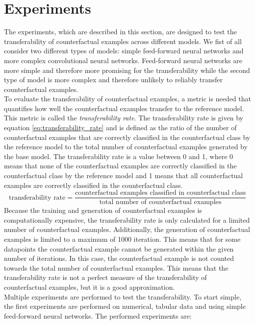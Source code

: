 \documentclass{article}
\begin{document}
\section{Experiments}
The experiments, which are described in this section, are designed to test the transferability of counterfactual examples across different models. We fist of all consider two different types of models: simple feed-forward neural networks and more complex convolutional neural networks. Feed-forward neural networks are more simple and therefore more promising for the transferability while the second type of model is more complex and therefore unlikely to reliably transfer counterfactual examples.\\
To evaluate the transferability of counterfactual examples, a metric is needed that quantifies how well the counterfactual examples transfer to the reference model. This metric is called the \textit{transferability rate}. The transferability rate is given by equation \ref{eq:transferability_rate} and is defined as the ratio of the number of counterfactual examples that are correctly classified in the counterfactual class by the reference model to the total number of counterfactual examples generated by the base model. The transferability rate is a value between 0 and 1, where 0 means that none of the counterfactual examples are correctly classified in the counterfactual class by the reference model and 1 means that all counterfactual examples are correctly classified in the counterfactual class.\\
\begin{equation}
    \text{transferability rate} = \frac{\text{counterfactual examples classified in counterfactual class}}{\text{total number of counterfactual examples}}
    \label{eq:transferability_rate}
\end{equation}
Because the training and generation of counterfactual examples is computationally expensive, the transferability rate is only calculated for a limited number of counterfactual examples. Additionally, the generation of counterfactual examples is limited to a maximum of 1000 iteration. This means that for some datapoints the counterfactual example cannot be generated within the given number of iterations. In this case, the counterfactual example is not counted towards the total number of counterfactual examples. This means that the transferability rate is not a perfect measure of the transferability of counterfactual examples, but it is a good approximation.\\
Multiple experiments are performed to test the transferability. To start simple, the first experiments are performed on numerical, tabular data and using simple feed-forward neural networks. The performed experiments are:
\end{document}
